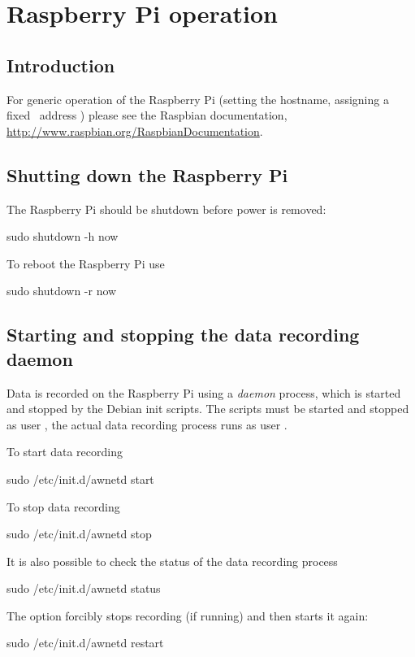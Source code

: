 \chapter{Raspberry Pi operation}

\section{Introduction}

For generic operation of the Raspberry Pi (setting the hostname,
assigning a fixed \ip\ address \etc) please see the Raspbian
documentation,
\url{http://www.raspbian.org/RaspbianDocumentation}.

\section{Shutting down the Raspberry Pi}

The Raspberry Pi should be shutdown before power is removed:
\begin{Cmd}
sudo shutdown -h now
\end{Cmd}

To reboot the Raspberry Pi use
\begin{Cmd}
sudo shutdown -r now
\end{Cmd}

\section{Starting and stopping the data recording daemon}

Data is recorded on the Raspberry Pi using a \emph{daemon} process,
which is started and stopped by the Debian init scripts. The scripts
must be started and stopped as user \rootUser, the actual data
recording process runs as user \piUser.

To start data recording
\begin{Cmd}
sudo /etc/init.d/awnetd start
\end{Cmd}

To stop data recording
\begin{Cmd}
sudo /etc/init.d/awnetd stop
\end{Cmd}

It is also possible to check the status of the data recording process
\begin{Cmd}
sudo /etc/init.d/awnetd status
\end{Cmd}

\label{awnetd-restart}
The  option forcibly stops recording (if running) and
then starts it again:
\begin{Cmd}
sudo /etc/init.d/awnetd restart
\end{Cmd}

